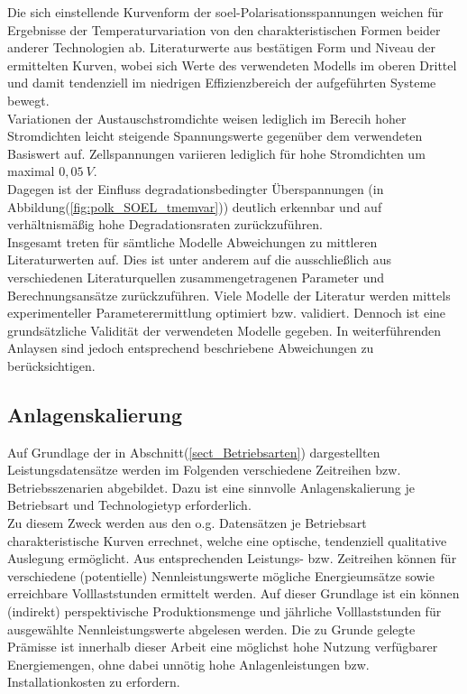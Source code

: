 \documentclass[onecolumn,10pt,titlepage]{article}
\begin{document}
Die sich einstellende Kurvenform der \gls{soel}-Polarisationsspannungen weichen für Ergebnisse der Temperaturvariation von den charakteristischen Formen beider anderer Technologien ab. Literaturwerte aus \cite{Buttler.2018} bestätigen Form und Niveau der ermittelten Kurven, wobei sich Werte des verwendeten Modells im oberen Drittel und damit tendenziell im niedrigen Effizienzbereich der aufgeführten Systeme bewegt.\\
Variationen der Austauschstromdichte weisen lediglich im Berecih hoher Stromdichten leicht steigende Spannungswerte gegenüber dem verwendeten Basiswert auf. Zellspannungen variieren lediglich für hohe Stromdichten um maximal $0,05~V$.\\
Dagegen ist der Einfluss degradationsbedingter Überspannungen (in Abbildung(\ref{fig:polk_SOEL_tmemvar})) deutlich erkennbar und auf verhältnismäßig hohe Degradationsraten zurückzuführen.\\
Insgesamt treten für sämtliche Modelle Abweichungen zu mittleren Literaturwerten auf. Dies ist unter anderem auf die ausschließlich aus verschiedenen Literaturquellen zusammengetragenen Parameter und Berechnungsansätze zurückzuführen. Viele Modelle der Literatur werden mittels experimenteller Parameterermittlung optimiert bzw. validiert. Dennoch ist eine grundsätzliche Validität der verwendeten Modelle gegeben. In weiterführenden Anlaysen sind jedoch entsprechend beschriebene Abweichungen zu berücksichtigen.
\newpage
\subsection{Anlagenskalierung}
\label{subs_ANL_SKAL}
Auf Grundlage der in Abschnitt(\ref{sect_Betriebsarten}) dargestellten Leistungsdatensätze werden im Folgenden verschiedene Zeitreihen bzw. Betriebsszenarien abgebildet. Dazu ist eine sinnvolle Anlagenskalierung je Betriebsart und Technologietyp erforderlich.\\
Zu diesem Zweck werden aus den o.g. Datensätzen je Betriebsart charakteristische Kurven errechnet, welche eine optische, tendenziell qualitative Auslegung ermöglicht. Aus entsprechenden Leistungs- bzw. Zeitreihen können für verschiedene (potentielle) Nennleistungswerte mögliche Energieumsätze sowie erreichbare Volllaststunden ermittelt werden. Auf dieser Grundlage ist ein können (indirekt) perspektivische Produktionsmenge und jährliche Volllaststunden für ausgewählte Nennleistungswerte abgelesen werden. Die zu Grunde gelegte Prämisse ist innerhalb dieser Arbeit eine möglichst hohe Nutzung verfügbarer Energiemengen, ohne dabei unnötig hohe Anlagenleistungen bzw. Installationkosten zu erfordern.
\end{document}
